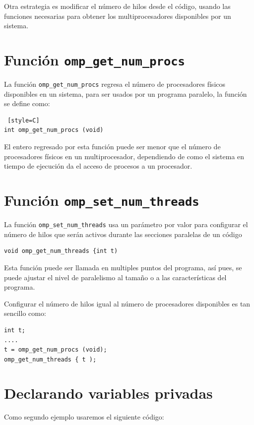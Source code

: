 \documentclass[12pt,letterpaper]{book}
\begin{document}
Otra estrategia es modificar el número de hilos desde el código, usando las funciones necesarias para obtener los multiprocesadores disponibles por un sistema.

\section{Funci\'on \texttt{omp\_get\_num\_procs}}

La función \texttt{omp\_get\_num\_procs} regresa el número de procesadores físicos disponibles en un sistema, para ser usados por un programa paralelo, la función se define como:

\begin{lstlisting} [style=C]
int omp_get_num_procs (void)
\end{lstlisting}

El entero regresado por esta función puede ser menor que el número de procesadores físicos en un multiprocesador, dependiendo de como el sistema en tiempo de ejecución da el acceso de procesos a un procesador.

\section{Funci\'on \texttt{omp\_set\_num\_threads}}
La función \texttt{omp\_set\_num\_threads} usa un parámetro por valor para configurar el número de hilos que serán activos durante las secciones paralelas de un código

\begin{lstlisting}[style=C]
void omp_get_num_threads {int t)
\end{lstlisting}

Esta función puede ser llamada en multiples puntos del programa, así pues, se puede ajustar el nivel de paralelismo al tamaño o a las características del programa.

Configurar el número de hilos igual al número de procesadores disponibles es tan sencillo como:

\begin{lstlisting}[style=C]
int t;
....
t = omp_get_num_procs (void);
omp_get_num_threads { t );
\end{lstlisting}

\section{Declarando variables privadas}
Como segundo ejemplo usaremos el siguiente código:
\end{document}
